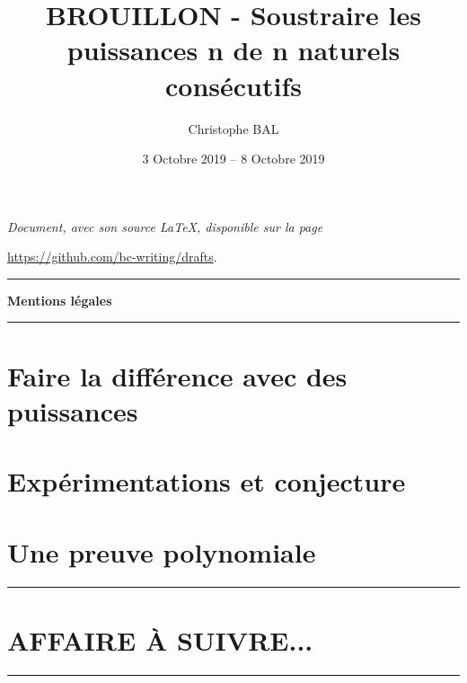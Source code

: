 \documentclass[12pt]{amsart}
\begin{document}
\title{BROUILLON - Soustraire les puissances n\ieme{} de n naturels consécutifs}
\author{Christophe BAL}
\date{3 Octobre 2019 -- 8 Octobre 2019}

\maketitle

\begin{center}
	\itshape
	Document, avec son source \LaTeX, disponible sur la page
	
	\url{https://github.com/bc-writing/drafts}.
\end{center}


\bigskip


\begin{center}
	\hrule\vspace{.3em}
	{
		\fontsize{1.35em}{1em}\selectfont
		\textbf{Mentions \og légales \fg}
	}
			
	\vspace{0.45em}
	\doclicenseThis
	\hrule
\end{center}


\bigskip
\setcounter{tocdepth}{1}
\tableofcontents



\newpage
\section{Faire la différence avec des puissances}






\newpage
\section{Expérimentations et conjecture}





\newpage
\section{Une preuve polynomiale}





\bigskip

\hrule

\section{AFFAIRE À SUIVRE...}

\bigskip

\hrule


%
%
\end{document}
